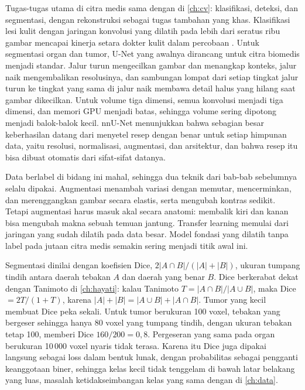 Tugas-tugas utama di citra medis sama dengan di \cref{ch:cv}: klasifikasi, deteksi, dan segmentasi, dengan rekonstruksi
sebagai tugas tambahan yang khas. Klasifikasi lesi kulit dengan jaringan konvolusi yang dilatih pada lebih dari seratus
ribu gambar mencapai kinerja setara dokter kulit dalam percobaan \citet{esteva2017}. Untuk segmentasi organ dan tumor,
U-Net \citep{ronneberger2015} yang awalnya dirancang untuk citra biomedis menjadi standar. Jalur turun mengecilkan gambar
dan menangkap konteks, jalur naik mengembalikan resolusinya, dan sambungan lompat dari setiap tingkat jalur turun ke tingkat
yang sama di jalur naik membawa detail halus yang hilang saat gambar dikecilkan. Untuk volume tiga dimensi, semua konvolusi
menjadi tiga dimensi, dan memori GPU menjadi batas, sehingga volume sering dipotong menjadi balok-balok kecil. nnU-Net
\citep{isensee2021} menunjukkan bahwa sebagian besar keberhasilan datang dari menyetel resep dengan benar untuk setiap
himpunan data, yaitu resolusi, normalisasi, augmentasi, dan arsitektur, dan bahwa resep itu bisa dibuat otomatis dari
sifat-sifat datanya.

Data berlabel di bidang ini mahal, sehingga dua teknik dari bab-bab sebelumnya selalu dipakai. Augmentasi menambah variasi
dengan memutar, mencerminkan, dan merenggangkan gambar secara elastis, serta mengubah kontras sedikit. Tetapi augmentasi
harus masuk akal secara anatomi: membalik kiri dan kanan bisa mengubah makna sebuah temuan jantung. Transfer learning
memulai dari jaringan yang sudah dilatih pada data besar. Model fondasi yang dilatih tanpa label pada jutaan citra medis
semakin sering menjadi titik awal ini.

Segmentasi dinilai dengan koefisien Dice, $2|A\cap B|/(|A|+|B|)$, ukuran tumpang tindih antara daerah tebakan $A$ dan
daerah yang benar $B$. Dice berkerabat dekat dengan Tanimoto di \cref{ch:hayati}: kalau Tanimoto $T=|A\cap B|/|A\cup B|$,
maka Dice $=2T/(1+T)$, karena $|A|+|B|=|A\cup B|+|A\cap B|$. Tumor yang kecil membuat Dice peka sekali. Untuk tumor
berukuran 100 voxel, tebakan yang bergeser sehingga hanya 80 voxel yang tumpang tindih, dengan ukuran tebakan tetap 100,
memberi Dice $160/200=0{,}8$. Pergeseran yang sama pada organ berukuran 10\,000 voxel nyaris tidak terasa. Karena itu Dice
juga dipakai langsung sebagai loss dalam bentuk lunak, dengan probabilitas sebagai pengganti keanggotaan biner, sehingga
kelas kecil tidak tenggelam di bawah latar belakang yang luas, masalah ketidakseimbangan kelas yang sama dengan di
\cref{ch:data}.

